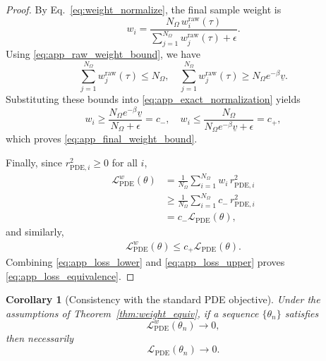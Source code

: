 \documentclass{article}
\theoremstyle{plain}
\newtheorem{corollary}[theorem]{Corollary}
\theoremstyle{definition}
\theoremstyle{remark}
\begin{document}
\begin{proof}
	By Eq.~\eqref{eq:weight_normalize}, the final sample weight is
	\begin{equation}
		w_i
		=
		\frac{N_{\Omega}\,w_i^{\mathrm{raw}}(\tau)}
		{\sum_{j=1}^{N_{\Omega}}w_j^{\mathrm{raw}}(\tau)+\epsilon}.
		\label{eq:app_exact_normalization}
	\end{equation}
	Using \eqref{eq:app_raw_weight_bound}, we have
	\[
	\sum_{j=1}^{N_{\Omega}}w_j^{\mathrm{raw}}(\tau)
	\leqslant
	N_{\Omega},
	\quad
	\sum_{j=1}^{N_{\Omega}}w_j^{\mathrm{raw}}(\tau)
	\geqslant
	N_{\Omega}e^{-\beta}\underline{v}.
	\]
	Substituting these bounds into \eqref{eq:app_exact_normalization} yields
	\[
	w_i
	\geqslant
	\frac{N_{\Omega}e^{-\beta}\underline{v}}{N_{\Omega}+\epsilon}
	=
	c_-,
	\quad
	w_i
	\leqslant
	\frac{N_{\Omega}}{N_{\Omega}e^{-\beta}\underline{v}+\epsilon}
	=
	c_+,
	\]
	which proves \eqref{eq:app_final_weight_bound}.
	
	Finally, since
	$r_{\mathrm{PDE},i}^{2}\geqslant 0$ for all $i$,
	\begin{align}
		\mathcal{L}_{\mathrm{PDE}}^{w}(\theta)
		&=
		\frac{1}{N_{\Omega}}
		\sum_{i=1}^{N_{\Omega}}
		w_i\,r_{\mathrm{PDE},i}^{2}
		\nonumber\\
		&\geqslant
		\frac{1}{N_{\Omega}}
		\sum_{i=1}^{N_{\Omega}}
		c_-\,r_{\mathrm{PDE},i}^{2}
		\nonumber\\
		&=
		c_-\mathcal{L}_{\mathrm{PDE}}(\theta),
		\label{eq:app_loss_lower}
	\end{align}
	and similarly,
	\begin{align}
		\mathcal{L}_{\mathrm{PDE}}^{w}(\theta)
		\leqslant
		c_+\mathcal{L}_{\mathrm{PDE}}(\theta).
		\label{eq:app_loss_upper}
	\end{align}
	Combining \eqref{eq:app_loss_lower} and \eqref{eq:app_loss_upper}
	proves \eqref{eq:app_loss_equivalence}.
\end{proof}

\begin{corollary}[Consistency with the standard PDE objective]
	\label{cor:loss_consistency}
	Under the assumptions of Theorem~\ref{thm:weight_equiv}, if a sequence
	$\{\theta_n\}$ satisfies
	\begin{equation}
		\mathcal{L}_{\mathrm{PDE}}^{w}(\theta_n)\to 0,
		\label{eq:app_weighted_loss_zero}
	\end{equation}
	then necessarily
	\begin{equation}
		\mathcal{L}_{\mathrm{PDE}}(\theta_n)\to 0.
		\label{eq:app_unweighted_loss_zero}
	\end{equation}
\end{corollary}
\end{document}
